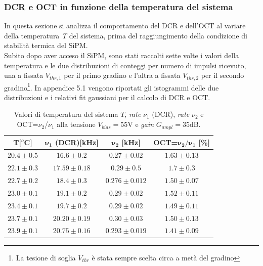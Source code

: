 \subsubsection{DCR e OCT in funzione della temperatura del sistema}
In questa sezione si analizza il comportamento del DCR e dell'OCT al variare della temperatura \textit{T} del sistema, prima del raggiungimento della condizione di stabilità termica del SiPM.\\
Subito dopo aver acceso il SiPM, sono stati raccolti sette volte i valori della temperatura e le due distribuzioni di conteggi per numero di impulsi ricevuto, una a fissata $V_{thr,1}$ per il primo gradino e l'altra a fissata $V_{thr,2}$ per il secondo gradino\footnote{La tesione di soglia $V_{thr}$ è stata sempre scelta circa a metà del gradino}. In appendice 5.1 vengono riportati gli istogrammi delle due distribuzioni e i relativi fit gaussiani per il calcolo di DCR e OCT.
\begin{table}[H]
    \centering
    \begin{tabular}{|c|c|c|c|}
        \hline
        
        \textbf{T[$^o$C]} & \textbf{$\mathbf{\nu_1}$ (DCR)[kHz]} & \textbf{$\mathbf{\nu_2}$ [kHz]} & \textbf{OCT=$\mathbf{\nu_2/\nu_1}$ [\%]} \\ \hline
        
        $20.4  \pm  0.5 $  &  $16.6  \pm  0.2  $  &  $ 0.27 \pm  0.02 $  &  $1.63  \pm  0.13 $ \\ \hline
        $22.1  \pm  0.3 $  &  $17.59  \pm  0.18  $  &  $0.29  \pm  0.5 $  &  $1.7  \pm  0.3 $ \\ \hline
        $22.7  \pm  0.2 $  &  $18.4  \pm  0.3  $  &  $0.276  \pm  0.012 $  &  $1.50  \pm  0.07 $ \\ \hline
        $23.0  \pm  0.1 $  &  $19.1  \pm  0.2  $  &  $0.29  \pm  0.02 $  &  $1.52  \pm  0.11 $ \\ \hline
        $23.4 \pm  0.1 $  &  $19.7  \pm  0.2  $  &  $0.29  \pm  0.02 $  &  $1.49  \pm  0.11 $ \\ \hline
        $23.7  \pm  0.1 $  &  $20.20  \pm  0.19  $  &  $0.30  \pm  0.03 $  &  $1.50  \pm  0.13 $ \\ \hline
        $23.9  \pm  0.1 $  &  $20.75  \pm  0.16  $  &  $0.293  \pm  0.019 $  &  $1.41  \pm  0.09 $ \\ \hline
        
    \end{tabular}
    \caption{\footnotesize Valori di temperatura del sistema $T$, \textit{rate} $\nu_1$ (DCR), \textit{rate} $\nu_2$ e OCT=$\nu_2$/$\nu_1$ alla tensione $V_{bias}=55$V e \textit{gain} $G_{ampl}=35$dB.}
    \label{tab:temp}    
\end{table}

